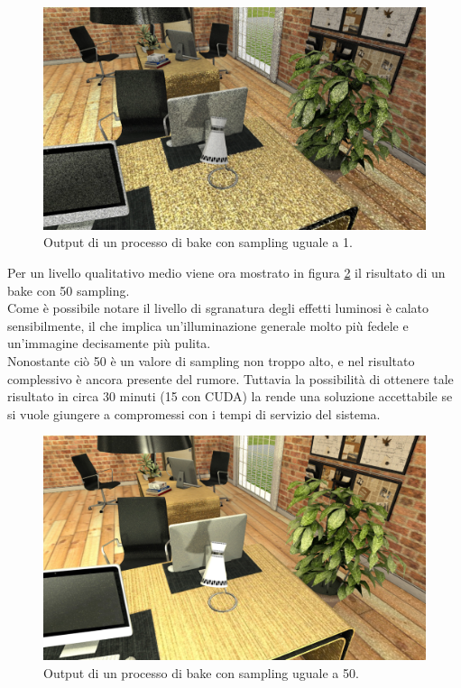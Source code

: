 \begin{figure}[htb]
 \centering
 \includegraphics[width=0.8\linewidth]{images/chapter_prove_sperimentali/sampl1.png}\hfill
 \caption[Output sampling 1]{Output di un processo di bake con sampling uguale a 1.}
 \label{fig:sampl1}
\end{figure}

Per un livello qualitativo medio viene ora mostrato in figura \ref{fig:sampl50} il risultato di un bake con 50 sampling. 
\\
Come è possibile notare il livello di sgranatura degli effetti luminosi è calato sensibilmente, il che implica un’illuminazione generale molto più fedele e un’immagine decisamente più pulita.
\\
Nonostante ciò 50 è un valore di sampling non troppo alto, e nel risultato complessivo è ancora presente del rumore. Tuttavia la possibilità di ottenere tale risultato in circa 30 minuti (15 con CUDA) la rende una soluzione accettabile se si vuole giungere a compromessi con i tempi di servizio del sistema.
\\
\begin{figure}[htb]
 \centering
 \includegraphics[width=0.8\linewidth]{images/chapter_prove_sperimentali/sampl50.png}\hfill
 \caption[Output sampling 50]{Output di un processo di bake con sampling uguale a 50.}
 \label{fig:sampl50}
\end{figure}

